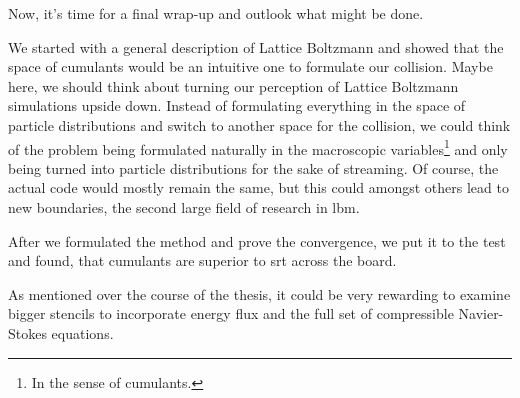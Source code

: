 
Now, it's time for a final wrap-up and outlook what might be done.

We started with a general description of Lattice Boltzmann and showed that the space of cumulants would be an intuitive one to formulate our collision.
Maybe here, we should think about turning our perception of Lattice Boltzmann simulations upside down.
Instead of formulating everything in the space of particle distributions and switch to another space for the collision, we could think of the problem being formulated naturally in the macroscopic variables\footnote{In the sense of cumulants.} and only being turned into particle distributions for the sake of streaming.
Of course, the actual code would mostly remain the same, but this could amongst others lead to new boundaries, the second large field of research in \gls{lbm}.

After we formulated the method and prove the convergence, we put it to the test and found, that cumulants are superior to \gls{srt} across the board.

As mentioned over the course of the thesis, it could be very rewarding to examine bigger stencils to incorporate energy flux and the full set of compressible Navier-Stokes equations.
